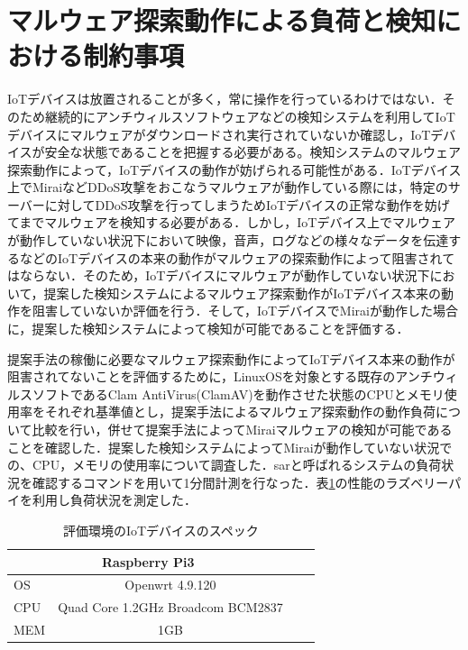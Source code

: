 \section{マルウェア探索動作による負荷と検知における制約事項}
IoTデバイスは放置されることが多く，常に操作を行っているわけではない．そのため継続的にアンチウィルスソフトウェアなどの検知システムを利用してIoTデバイスにマルウェアがダウンロードされ実行されていないか確認し，IoTデバイスが安全な状態であることを把握する必要がある。検知システムのマルウェア探索動作によって，IoTデバイスの動作が妨げられる可能性がある．IoTデバイス上でMiraiなどDDoS攻撃をおこなうマルウェアが動作している際には，特定のサーバーに対してDDoS攻撃を行ってしまうためIoTデバイスの正常な動作を妨げてまでマルウェアを検知する必要がある．しかし，IoTデバイス上でマルウェアが動作していない状況下において映像，音声，ログなどの様々なデータを伝達するなどのIoTデバイスの本来の動作がマルウェアの探索動作によって阻害されてはならない．そのため，IoTデバイスにマルウェアが動作していない状況下において，提案した検知システムによるマルウェア探索動作がIoTデバイス本来の動作を阻害していないか評価を行う．そして，IoTデバイスでMiraiが動作した場合に，提案した検知システムによって検知が可能であることを評価する．\par
提案手法の稼働に必要なマルウェア探索動作によってIoTデバイス本来の動作が阻害されてないことを評価するために，LinuxOSを対象とする既存のアンチウィルスソフトであるClam AntiVirus(ClamAV)を動作させた状態のCPUとメモリ使用率をそれぞれ基準値とし，提案手法によるマルウェア探索動作の動作負荷について比較を行い，併せて提案手法によってMiraiマルウェアの検知が可能であることを確認した．提案した検知システムによってMiraiが動作していない状況での、CPU，メモリの使用率について調査した．sarと呼ばれるシステムの負荷状況を確認するコマンドを用いて1分間計測を行なった．表\ref{tab:spec}の性能のラズベリーパイを利用し負荷状況を測定した．
\begin{table}[h]
   \caption{評価環境のIoTデバイスのスペック}
   \label{tab:spec}
   \centering
   \begin{tabular}{|l|c|l|l|l|}
   \hline
   \multicolumn{3}{|c|}{Raspberry Pi3} \\ \hline
   OS     & \multicolumn{2}{c|}{Openwrt 4.9.120}                   \\ \hline
   CPU    & \multicolumn{2}{c|}{Quad Core 1.2GHz Broadcom BCM2837} \\ \hline
   MEM    & \multicolumn{2}{c|}{1GB}                               \\ \hline
   \end{tabular}
\end{table}

